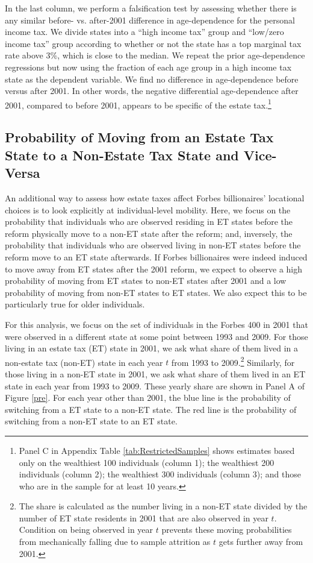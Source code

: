 \documentclass[12pt]{article}
\begin{document}
In the last column, we perform a falsification test by assessing whether there is any similar before- vs. after-2001 difference in age-dependence for the personal income tax. We divide states into a ``high income tax'' group and ``low/zero income tax'' group according to whether or not the state has a top marginal tax rate above 3\%, which is close to the median. We repeat the prior age-dependence regressions but now using the fraction of each age group in a high income tax state as the dependent variable. We find  no difference in age-dependence before versus after 2001. In other words, the negative differential age-dependence after 2001, compared to before 2001, appears to be specific of the estate tax.\footnote{Panel C in Appendix Table \ref{tab:RestrictedSamples} shows estimates based only on the wealthiest 100 individuals (column 1); 
the wealthiest 200 individuals (column 2); the wealthiest 300 individuals (column 3); and those who are in the sample for at least 10 years.}


\subsection{Probability of Moving from an Estate Tax State to a Non-Estate Tax State and Vice-Versa}

An additional way to assess how estate taxes affect Forbes billionaires' locational choices is to look explicitly at individual-level mobility. Here, we focus on the probability that individuals who are observed residing in ET states before the reform physically move  to a non-ET state after the reform; and, inversely, the probability  that individuals who are observed living in non-ET states before the reform move to an ET state afterwards. 
If Forbes billionaires were indeed induced to move away from ET states  after the 2001 reform, we expect to observe  a high probability of moving  from ET states to non-ET states after 2001 and a low probability of moving from non-ET states to ET states.  We also expect this to be particularly true for older individuals.  

For this analysis, we focus on the set of individuals in the Forbes 400 in 2001 that were observed in a different state at some point between 1993 and 2009. For those living in an estate tax (ET) state in 2001, we ask what share of them lived in a non-estate tax (non-ET) state in each year $t$ from 1993 to 2009.\footnote{The share is calculated as the number living in a non-ET state divided by the number of ET state residents in 2001 that are also observed in year $t$. Condition on being observed in year $t$ prevents these moving probabilities from mechanically falling due to sample attrition as $t$ gets further away from 2001.} Similarly, for those living in a non-ET state in 2001, we ask what share of them lived in an ET state in each year from 1993 to 2009. These yearly share are shown in Panel A of Figure \ref{pre}. For each year other than 2001, the blue line is the probability of switching from a ET state to a non-ET state. The red line is the probability of switching from a non-ET state to an ET state.  
\end{document}
